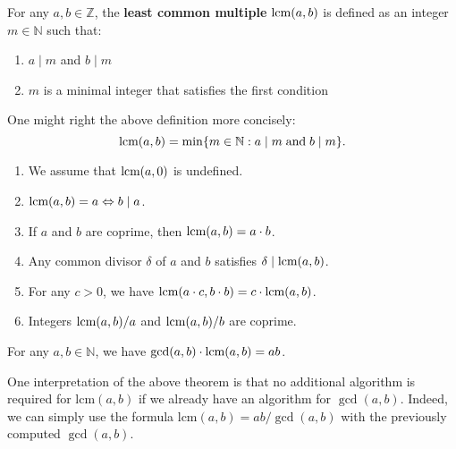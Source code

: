 \documentclass[../lecture-notes-148x210.tex]{subfiles}
\begin{document}
\begin{definition}[LCM]
    For any $a, b \in \mathbb{Z}$, the \textbf{least common multiple} $\text{lcm}(a,
    b)$ is defined as an integer $m \in \mathbb{N}$ such that:
    \begin{enumerate}
        \item $a \mid m$ and $b \mid m$
        \item $m$ is a minimal integer that satisfies the first condition 
    \end{enumerate}

    One might right the above definition more concisely:
    \begin{equation*}
        \text{lcm}(a,b) = \min\{m \in \mathbb{N}: a \mid m \; \text{and} \; b \mid m\}.
    \end{equation*}
\end{definition}

\begin{lemma} 
    \hfil
    \begin{enumerate}
        \item We assume that $\text{lcm}(a, 0)$ is undefined.
        \item $\text{lcm}(a, b) = a \Leftrightarrow b \mid a$.
        \item If $a$ and $b$ are coprime, then $\text{lcm}(a, b) = a \cdot b$.
        \item Any common divisor $\delta$ of $a$ and $b$ satisfies $\delta \mid \text{lcm}(a, b)$.
        \item For any $c > 0$, we have $\text{lcm}(a \cdot c, b \cdot b) =  c \cdot \text{lcm}(a, b)$.
        \item Integers $\text{lcm}(a, b)/a$ and $\text{lcm}(a, b) / b$ are coprime.
    \end{enumerate}
\end{lemma}

\begin{theorem}
    For any $a, b \in \mathbb{N}$, we have $\text{gcd}(a, b) \cdot \text{lcm}(a, b) = ab$.
\end{theorem}

One interpretation of the above theorem is that no additional algorithm is required for
$\text{lcm}(a, b)$ if we already have an algorithm for $\gcd(a, b)$. Indeed, we
can simply use the formula $\text{lcm}(a, b) = ab / \gcd(a, b)$ with the
previously computed $\gcd(a, b)$.
\end{document}
